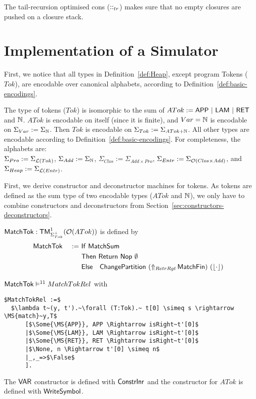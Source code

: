 The tail-recursion optimised cons ($\cons_{tr}$) makes sure that no empty closures are\\ pushed on a closure stack.




\section{Implementation of a Simulator}
\label{sec:heap-implementation}

First, we notice that all types in Definition~\ref{def:Heap}, except program Tokens ($Tok$), are encodable over canonical alphabets, according to
Definition~\ref{def:basic-encodings}.
\begin{definition}
  \label{def:Heap-encode}
  The type of tokens ($Tok$) is isomorphic to the sum of $ATok := \MS{APP} ~|~ \MS{LAM} ~|~ \MS{RET}$ and $\Nat$.  $ATok$ is encodable on itself
  (since it is finite), and $Var = \Nat$ is encodable on $\Sigma_{Var} := \Sigma_\Nat$.  Then $Tok$ is encodable on
  $\Sigma_{Tok} := \Sigma_{ATok+\Nat}$.  All other types are encodable according to Definition~\ref{def:basic-encodings}.
  For completeness, the alphabets are:\\
  $\Sigma_{Pro} := \Sigma_{\List(Tok)}$, $\Sigma_{Add} := \Sigma_\Nat$, $\Sigma_{Clos}:=\Sigma_{Add \times Pro}$,
  $\Sigma_{Entr} := \Sigma_{\Option(Clos \times Add)}$, and $\Sigma_{Heap} := \Sigma_{\List(Entr)}$.
\end{definition}

First, we derive constructor and deconstructor machines for tokens.  As tokens are defined as the sum type of two encodable types ($ATok$ and $\Nat$),
we only have to combine constructors and deconstructors from Section~\ref{sec:constructors-deconstructors}.
\begin{definition}[$\MS{MatchTok}$]
  $\MS{MatchTok} : \TM_{\Sigma^+_{Tok}}^1(\Option(ATok))$ is defined by
  \begin{alignat*}{2}
    & \MS{MatchTok} &~:=~& \MS{If}~\MS{MatchSum} \\
    &               &    & \MS{Then}~   \Return{\Nop}{\None} \\
    &               &    & \MS{Else}~~~ \MS{ChangePartition}~(\LiftAlphabet{\MS{MatchFin}}{RetrRgt})~(\Some\cdot)
  \end{alignat*}
\end{definition}
\begin{lemma}
  \label{lem:MatchTok_Realise}
  $\MS{MatchTok} \RealiseIn{11} MatchTokRel$ with
\begin{lstlisting}[style=semicoqstyle]
$MatchTokRel :=$
  $\lambda t~(y, t').~\forall (T:Tok).~ t[0] \simeq s \rightarrow \MS{match}~y,T$
      [$\Some{\MS{APP}}, APP \Rightarrow isRight~t'[0]$
      |$\Some{\MS{LAM}}, LAM \Rightarrow isRight~t'[0]$
      |$\Some{\MS{RET}}, RET \Rightarrow isRight~t'[0]$
      |$\None, n \Rightarrow t'[0] \simeq n$
      |_,_=>$\False$
      ].
\end{lstlisting}
\end{lemma}
The $\MS{VAR}$ constructor is defined with $\MS{ConstrInr}$ and the constructor for $ATok$ is defined with $\MS{WriteSymbol}$.

